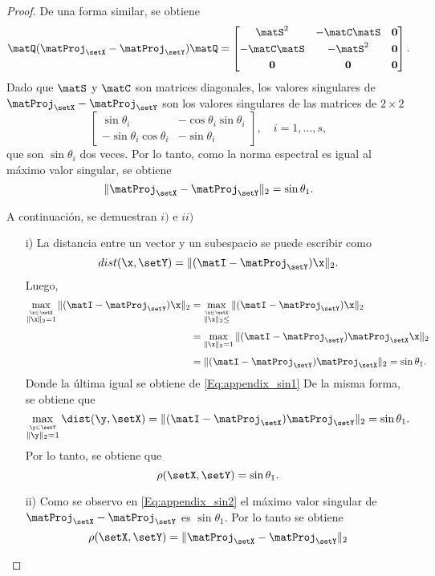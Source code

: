\begin{proof}
            De una forma similar, se obtiene
             \[\matQ(\matProj_{\setX} - \matProj_{\setY})\matQ  =  \begin{bmatrix} \matS^2 & -\matC\matS & \mathbf{0}\\[0.3em] -\matC\matS & -\matS^2 & \mathbf{0}\\[0.3em] \mathbf{0} & \mathbf{0} & \mathbf{0}
            \end{bmatrix}.\]
             Dado que $\matS$ y $\matC$ son matrices diagonales, los valores singulares de $\matProj_{\setX}-\matProj_{\setY}$ son los valores singulares de las matrices de $2\times 2$
            \[\begin{bmatrix} \sin\theta_i & -\cos\theta_i\sin\theta_i\\[0.3em] -\sin\theta_i\cos\theta_i & -\sin\theta_i\end{bmatrix}, \quad i = 1,\ldots, s,\]
            que son $\sin\theta_i$ dos veces. Por lo tanto, como la norma espectral es igual al máximo valor singular, se obtiene
            \begin{equation} \|\matProj_{\setX} - \matProj_{\setY}\|_2 = \sin\theta_1.\label{Eq:appendix_sin2}\end{equation}

            A continuación, se demuestran $i)$ e $ii)$
		\begin{itemize}
		    \item[i)] La distancia entre un vector y un subespacio se puede escribir como
                    \[dist(\x,\setY) = \|(\matI -\matProj_{\setY})\x\|_2.\]
                    Luego,
                    \[\begin{aligned} \max_{\stackrel{\x\in\setX}{\|\x\|_2=1}} \|(\matI -\matProj_{\setY})\x\|_2 & = \max_{\stackrel{\x\in\setX}{\|\x\|_2\le }} \|(\matI -\matProj_{\setY})\x\|_2\\[0.3em]
                    & = \max_{\|\x\|_2=1}\|(\matI-\matProj_{\setY})\matProj_{\setX}\x\|_2 \\[0.3em]
                    & = \|(\matI-\matProj_{\setY})\matProj_{\setX}\|_2 = \sin\theta_1.
                    \end{aligned}\]
                    Donde la última igual se obtiene de \eqref{Eq:appendix_sin1}
                    De la misma forma, se obtiene que 
                    \[\max_{\stackrel{\y\in\setY}{\|\y\|_2=1}}\dist(\y,\setX) = \|(\matI-\matProj_{\setX})\matProj_{\setY}\|_2 = \sin\theta_1.\]
                Por lo tanto, se obtiene que 
                \[\rho(\setX,\setY) = \sin\theta_1.\]
                
            \item[ii)] Como se observo en \eqref{Eq:appendix_sin2} el máximo valor singular de $\matProj_{\setX}-\matProj_{\setY}$ es $\sin\theta_1$. Por lo tanto se obtiene
            \[\rho(\setX,\setY) = \|\matProj_{\setX}-\matProj_{\setY}\|_2\]
            
		\end{itemize}
	\end{proof}
	